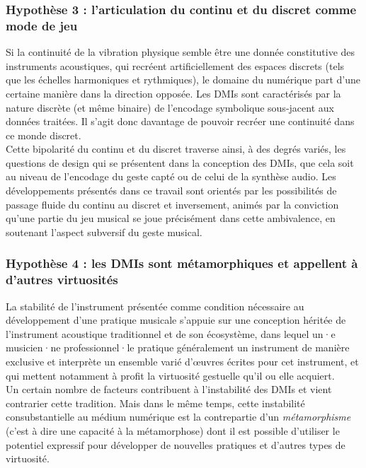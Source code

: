 \subsubsection*{Hypothèse 3 : l'articulation du continu et du discret comme mode de jeu}
\noindent Si la continuité de la vibration physique semble être une donnée constitutive des instruments acoustiques, qui recréent artificiellement des espaces discrets (tels que les échelles harmoniques et rythmiques), le domaine du numérique part d'une certaine manière dans la direction opposée. Les \glspl{DMI} sont caractérisés par la nature discrète (et même binaire) de l'encodage symbolique sous-jacent aux données traitées. Il s'agit donc davantage de pouvoir recréer une continuité dans ce monde discret.\\
\indent Cette bipolarité du continu et du discret traverse ainsi, à des degrés variés, les questions de design qui se présentent dans la conception des \glspl{DMI}, que cela soit au niveau de l'encodage du geste capté ou de celui de la synthèse audio. Les développements présentés dans ce travail sont orientés par les possibilités de passage fluide du continu au discret et inversement, animés par la conviction qu'une partie du jeu musical se joue précisément dans cette ambivalence, en soutenant l'aspect subversif du geste musical.

\subsubsection*{Hypothèse 4 : les DMIs sont métamorphiques et appellent à d'autres virtuosités}

\noindent La stabilité de l'instrument présentée comme condition nécessaire au développement d'une pratique musicale s'appuie sur une conception héritée de l'instrument acoustique traditionnel et de son écosystème, dans lequel un·e musicien·ne professionnel·le pratique généralement un instrument de manière exclusive et interprète un ensemble varié d'œuvres écrites pour cet instrument, et qui mettent notamment à profit la virtuosité gestuelle qu'il ou elle acquiert.\\
\indent Un certain nombre de facteurs contribuent à l'instabilité des \glspl{DMI} et vient contrarier cette tradition. Mais dans le même temps, cette instabilité consubstantielle au médium numérique est la contrepartie d'un \textit{métamorphisme} (c'est à dire une capacité à la métamorphose) dont il est possible d'utiliser le potentiel expressif pour développer de nouvelles pratiques et d'autres types de virtuosité.



